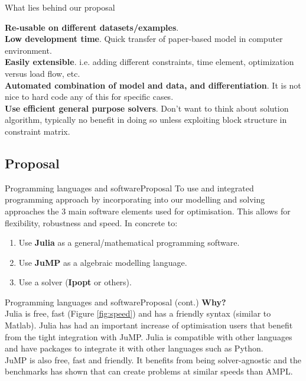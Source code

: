 \documentclass[handout]{beamer}
\begin{document}

\begin{frame}[t]{What lies behind our proposal}

\textbf{Re-usable on different datasets/examples}.\\[6pt]

\textbf{Low development time}. Quick transfer of paper-based model in computer environment.\\[6pt]

\textbf{Easily extensible}. i.e. adding different constraints, time element, optimization versus load flow, etc.\\[6pt]

\textbf{Automated combination of model and data, and differentiation}. It is not nice to hard code any of this for specific cases.\\[6pt]

\textbf{Use efficient general purpose solvers}. Don't want to think about solution algorithm, typically no benefit in doing so unless exploiting block structure in constraint matrix.

\end{frame}




\subsection{Proposal}
\begin{frame}[t]{Programming languages and software}{Proposal}
  To use and integrated programming approach by incorporating into our modelling and solving approaches the 3 main software elements used for optimisation. This allows for flexibility, robustness and speed. In concrete to:\\[12pt]
\begin{enumerate}
  \item Use \textbf{Julia} as a general/mathematical programming software.
  \item Use \textbf{JuMP} as a algebraic modelling language.
  \item Use a solver (\textbf{Ipopt} or others).
\end{enumerate}
\end{frame}

\begin{frame}[t]{Programming languages and software}{Proposal (cont.)}
  \textbf{Why?}\\[12pt]
  Julia is free, fast (Figure \ref{fig:speed}) and has a friendly syntax (similar to Matlab). Julia has had an important increase of optimisation users that benefit from the tight integration with JuMP. Julia is compatible with other languages and have packages to integrate it with other languages such as Python.\\[6pt]

  JuMP is also free, fast and friendly. It benefits from being solver-agnostic and the benchmarks has shown that can create problems at similar speeds than AMPL.
\end{frame}
\end{document}
